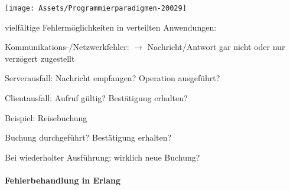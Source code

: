 \documentclass[10pt]{article}
\begin{document}
  \begin{center}
    \centering
    \texttt{[image: Assets/Programmierparadigmen-20029]}
  \end{center}
  
  vielfältige Fehlermöglichkeiten in verteilten Anwendungen: 
  \begin{itemize*}
    \item Kommunikations-/Netzwerkfehler: $\rightarrow$ Nachricht/Antwort gar nicht oder nur verzögert zugestellt
    \item Serverausfall: Nachricht empfangen? Operation ausgeführt?
    \item Clientausfall: Aufruf gültig? Bestätigung erhalten?
    \item Beispiel: Reisebuchung
    \begin{itemize*}
      \item Buchung durchgeführt? Bestätigung erhalten?
      \item Bei wiederholter Ausführung: wirklich neue Buchung?
    \end{itemize*}
  \end{itemize*}
  
  \paragraph{Fehlerbehandlung in Erlang}
  
\end{document}
